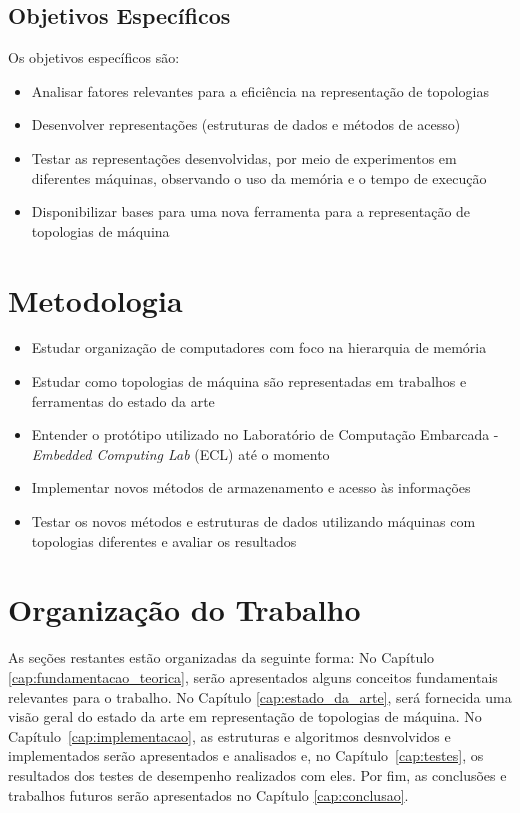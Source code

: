 \subsection{Objetivos Específicos}
\label{subsec:objetivos_especificos}

Os objetivos específicos são:
\begin{itemize}
	\item Analisar fatores relevantes para a eficiência na representação de topologias
	\item Desenvolver representações (estruturas de dados e métodos de acesso)
	\item Testar as representações desenvolvidas, por meio de experimentos em diferentes máquinas, observando o uso da memória e o tempo de execução
	\item Disponibilizar bases para uma nova ferramenta para a representação de topologias de máquina
\end{itemize}



\section{Metodologia}
\label{sec:metodologia}

\begin{itemize}
	\item Estudar organização de computadores com foco na hierarquia de memória
	\item Estudar como topologias de máquina são representadas em trabalhos e ferramentas do estado da arte
	\item Entender o protótipo utilizado no Laboratório de Computação Embarcada - \textit{Embedded Computing Lab} (ECL) até o momento
	\item Implementar novos métodos de armazenamento e acesso às informações
	\item Testar os novos métodos e estruturas de dados utilizando máquinas com topologias diferentes e avaliar os resultados
\end{itemize}



\section{Organização do Trabalho}
\label{sec:organizacao_do_trabalho}

As seções restantes estão organizadas da seguinte forma:
No Capítulo \ref{cap:fundamentacao_teorica}, serão apresentados alguns conceitos fundamentais relevantes para o trabalho.
No Capítulo \ref{cap:estado_da_arte}, será fornecida uma visão geral do estado da arte em representação de topologias de máquina.
No Capítulo~\ref{cap:implementacao}, as estruturas e algoritmos desnvolvidos e implementados serão apresentados e analisados e, no Capítulo~\ref{cap:testes}, os resultados dos testes de desempenho realizados com eles.
Por fim, as conclusões e trabalhos futuros serão apresentados no Capítulo \ref{cap:conclusao}.
